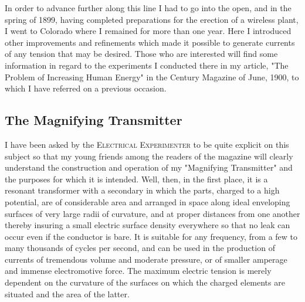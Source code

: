 \documentclass[a4paper,12pt,english,twoside,openright]{memoir}
\begin{document}
In order to advance further along this line I had to go into the open, and in the spring of 1899, 
having completed preparations for the erection of a wireless plant, I went to Colorado where I 
remained for more than one year.  Here I introduced other improvements and refinements which 
made it possible to generate currents of any tension that may be desired.  Those who are 
interested will find some information in regard to the experiments I conducted there in my article, 
"The Problem of Increasing Human Energy" in the Century Magazine of June, 1900, to which I 
have referred on a previous occasion.  

\subsection{The Magnifying Transmitter}
I have been asked by the \textsc{Electrical Experimenter} to be quite explicit on this subject so 
that my young friends among the readers of the magazine will clearly understand the construction 
and operation of my "Magnifying Transmitter" and the purposes for which it is intended.  Well, 
then, in the first place, it is a resonant transformer with a secondary in which the parts, charged to 
a high potential, are of considerable area and arranged in space along ideal enveloping surfaces 
of very large radii of curvature, and at proper distances from one another thereby insuring a small 
electric surface density everywhere so that no leak can occur even if the conductor is bare.  It is 
suitable for any frequency, from a few to many thousands of cycles per second, and can be used 
in the production of currents of tremendous volume and moderate pressure, or of smaller 
amperage and immense electromotive force.  The maximum electric tension is merely dependent 
on the curvature of the surfaces on which the charged elements are situated and the area of the 
latter.  
\end{document}

